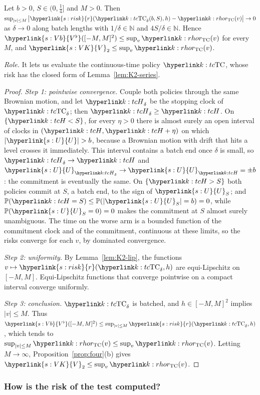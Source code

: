 \documentclass[11pt]{article}
\DeclareRobustCommand{\sy}[2]{{\hyperlink{#1}{#2}}}
\newcommand{\Nat}{\mathbb{N}}
\renewcommand{\P}{\mathbb{P}}
\newcommand{\1}{\mathbf{1}}
\newcommand{\rk}{\sy{s:risk}{r}}
\newcommand{\VK}{\sy{s:VK}{V}}
\newcommand{\Vb}{\sy{s:Vb}{V^\flat}}
\newcommand{\Ud}{\sy{s:U}{U}}
\begin{document}
\begin{lemma}\label{lem:K2-conv}
Let $b>0$, $S\in(0,\frac14]$ and $M>0$. Then $\sup_{|v|\le M}\big|\rk(\kTC_\delta(b,S),h)-\kr(v)\big|\to0$ as $\delta\to0$ along batch lengths with $1/\delta\in\Nat$
and $4S/\delta\in\Nat$. Hence $\Vb([-M,M]^2)\le\sup_v\kr(v)$ for every $M$, and $\VK_2\le\sup_v\kr(v)$.
\end{lemma}
\noindent\textit{Role.} It lets us evaluate the continuous-time policy $\kTC$, whose risk has the closed form of Lemma~\ref{lem:K2-series}.
\begin{proof}
\textit{Step 1: pointwise convergence.} Couple both policies through the same Brownian motion, and let $\kH_\delta$ be the stopping clock of $\kTC_\delta$; then
$\kH_\delta\ge\kH$. On $\{\kH<S\}$, for every $\eta>0$ there is almost surely an open interval of clocks in $(\kH,\kH+\eta)$ on which $|\Ud|>b$, because a Brownian motion
with drift that hits a level crosses it immediately. This interval contains a batch end once $\delta$ is small, so $\kH_\delta\to\kH$ and
$\Ud_{\kH_\delta}\to\Ud_{\kH}=\pm b$: the commitment is eventually the same. On $\{\kH>S\}$ both policies commit at $S$, a batch end, to the sign of $\Ud_S$; and
$\P(\kH=S)\le\P(|\Ud_S|=b)=0$, while $\P(\Ud_S=0)=0$ makes the commitment at $S$ almost surely unambiguous. The time on the worse arm is a bounded function of the commitment clock and of the commitment, continuous at these limits, so the risks
converge for each $v$, by dominated convergence.

\textit{Step 2: uniformity.} By Lemma~\ref{lem:K2-lip}, the functions $v\mapsto\rk(\kTC_\delta,h)$ are equi-Lipschitz on $[-M,M]$. Equi-Lipschitz functions that converge
pointwise on a compact interval converge uniformly.

\textit{Step 3: conclusion.} $\kTC_\delta$ is batched, and $h\in[-M,M]^2$ implies $|v|\le M$. Thus $\Vb([-M,M]^2)\le\sup_{|v|\le M}\rk(\kTC_\delta,h)$, which tends to
$\sup_{|v|\le M}\kr(v)\le\sup_v\kr(v)$. Letting $M\to\infty$, Proposition~\ref{prop:four}(b) gives $\VK_2\le\sup_v\kr(v)$.
\end{proof}

\subsubsection{How is the risk of the test computed?}
\end{document}
